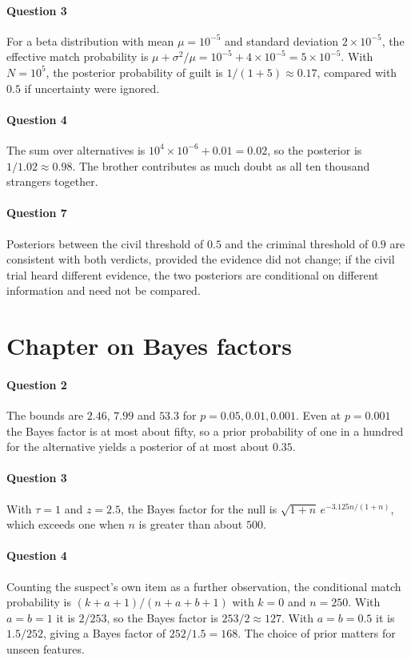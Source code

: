 \paragraph{Question 3} For a beta distribution with mean $\mu = 10^{-5}$ and standard deviation $2\times 10^{-5}$, the effective match probability is $\mu + \sigma^2/\mu = 10^{-5} + 4\times 10^{-5} = 5\times 10^{-5}$. With $N = 10^5$, the posterior probability of guilt is $1/(1 + 5) \approx 0.17$, compared with $0.5$ if uncertainty were ignored.
\paragraph{Question 4} The sum over alternatives is $10^4\times 10^{-6} + 0.01 = 0.02$, so the posterior is $1/1.02\approx 0.98$. The brother contributes as much doubt as all ten thousand strangers together.
\paragraph{Question 7} Posteriors between the civil threshold of $0.5$ and the criminal threshold of $0.9$ are consistent with both verdicts, provided the evidence did not change; if the civil trial heard different evidence, the two posteriors are conditional on different information and need not be compared.

\section*{Chapter on Bayes factors}
\paragraph{Question 2} The bounds are $2.46$, $7.99$ and $53.3$ for $p = 0.05, 0.01, 0.001$. Even at $p = 0.001$ the Bayes factor is at most about fifty, so a prior probability of one in a hundred for the alternative yields a posterior of at most about $0.35$.
\paragraph{Question 3} With $\tau = 1$ and $z = 2.5$, the Bayes factor for the null is $\sqrt{1+n}\,e^{-3.125 n/(1+n)}$, which exceeds one when $n$ is greater than about $500$.
\paragraph{Question 4} Counting the suspect's own item as a further observation, the conditional match probability is $(k+a+1)/(n+a+b+1)$ with $k=0$ and $n=250$. With $a = b = 1$ it is $2/253$, so the Bayes factor is $253/2\approx 127$. With $a = b = 0.5$ it is $1.5/252$, giving a Bayes factor of $252/1.5 = 168$. The choice of prior matters for unseen features.
